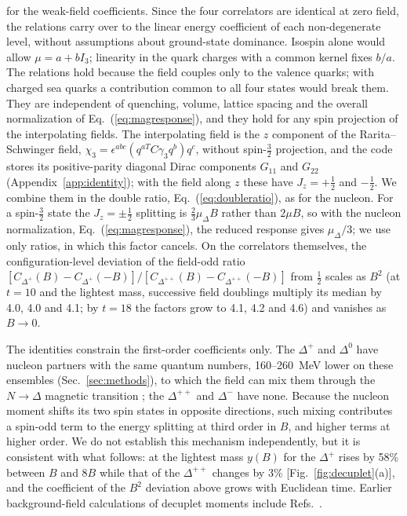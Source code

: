 \documentclass[aps,prd,reprint,twocolumn,superscriptaddress,nofootinbib,longbibliography]{revtex4-2}
\begin{document}
for the weak-field coefficients. Since the four correlators are identical at zero field, the relations carry over to the linear energy coefficient of each non-degenerate level, without assumptions about ground-state dominance. Isospin alone would allow $\mu=a+bI_3$; linearity in the quark charges with a common kernel fixes $b/a$. The relations hold because the field couples only to the valence quarks; with charged sea quarks a contribution common to all four states would break them. They are independent of quenching, volume, lattice spacing and the overall normalization of Eq.~(\ref{eq:magresponse}), and they hold for any spin projection of the interpolating fields. The interpolating field is the $z$ component of the Rarita--Schwinger field, $\chi_3=\epsilon^{abc}(q^{aT}C\gamma_3q^b)q^c$, without spin-$\tfrac32$ projection, and the code stores its positive-parity diagonal Dirac components $G_{11}$ and $G_{22}$ (Appendix~\ref{app:identity}); with the field along $z$ these have $J_z=+\tfrac12$ and $-\tfrac12$. We combine them in the double ratio, Eq.~(\ref{eq:doubleratio}), as for the nucleon. For a spin-$\tfrac32$ state the $J_z=\pm\tfrac12$ splitting is $\tfrac23\mu_\Delta B$ rather than $2\mu B$, so with the nucleon normalization, Eq.~(\ref{eq:magresponse}), the reduced response gives $\mu_\Delta/3$; we use only ratios, in which this factor cancels. On the correlators themselves, the configuration-level deviation of the field-odd ratio $[C_{\Delta^+}(B)-C_{\Delta^+}(-B)]/[C_{\Delta^{++}}(B)-C_{\Delta^{++}}(-B)]$ from $\tfrac12$ scales as $B^2$ (at $t=10$ and the lightest mass, successive field doublings multiply its median by 4.0, 4.0 and 4.1; by $t=18$ the factors grow to 4.1, 4.2 and 4.6) and vanishes as $B\to0$.

The identities constrain the first-order coefficients only. The $\Delta^+$ and $\Delta^0$ have nucleon partners with the same quantum numbers, 160--260~MeV lower on these ensembles (Sec.~\ref{sec:methods}), to which the field can mix them through the $N\to\Delta$ magnetic transition \cite{Batelaan2023,DeshmukhTiburzi2018}; the $\Delta^{++}$ and $\Delta^-$ have none. Because the nucleon moment shifts its two spin states in opposite directions, such mixing contributes a spin-odd term to the energy splitting at third order in $B$, and higher terms at higher order. We do not establish this mechanism independently, but it is consistent with what follows: at the lightest mass $y(B)$ for the $\Delta^+$ rises by 58\% between $B$ and $8B$ while that of the $\Delta^{++}$ changes by 3\% [Fig.~\ref{fig:decuplet}(a)], and the coefficient of the $B^2$ deviation above grows with Euclidean time. Earlier background-field calculations of decuplet moments include Refs.~\cite{Lee2005BaryonMom,Aubin2009Delta}.
\end{document}
